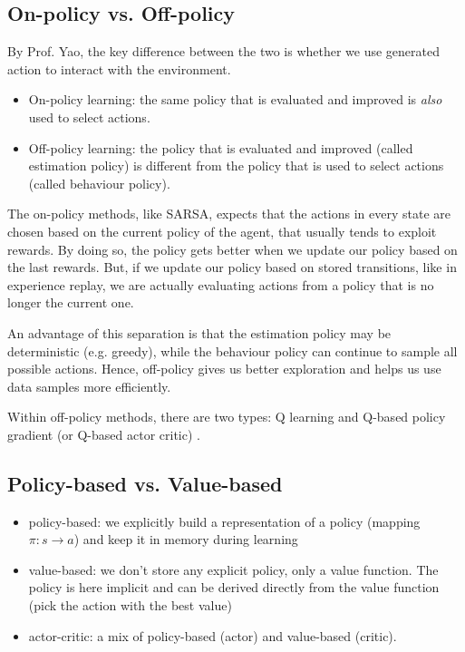 \documentclass[lang=en,mode=normal,device=normal,color=blue,12pt]{elegantnote}
\DeclareMathOperator*{\1}{\mathbbm{1}}
\begin{document}
\subsection{On-policy vs. Off-policy}
\label{appendix:on-off-policy}

By Prof. Yao, the key difference between the two is whether we use generated action to interact with the environment.

\begin{itemize}
\item On-policy learning: the same policy that is evaluated and improved is \textit{also} used to select actions.
\item Off-policy learning: the policy that is evaluated and improved (called estimation policy) is different from the policy that is used to select actions (called behaviour policy).
\end{itemize}

The on-policy methods, like SARSA, expects that the actions in every state are chosen based on the current policy of the agent, that usually tends to exploit rewards. By doing so, the policy gets better when we update our policy based on the last rewards. But, if we update our policy based on stored transitions, like in experience replay, we are actually evaluating actions from a policy that is no longer the current one.

An advantage of this separation is that the estimation policy may be deterministic (e.g. greedy), while the behaviour policy can continue to sample all possible actions.
Hence, off-policy gives us better exploration and helps us use data samples more efficiently.

Within off-policy methods, there are two types: Q learning and Q-based policy gradient (or Q-based actor critic) \cite{ytbcs287}.

\subsection{Policy-based vs. Value-based}

\begin{itemize}
\item policy-based: we explicitly build a representation of a policy (mapping $\pi:s\rightarrow a$) and keep it in memory during learning
\item value-based: we don't store any explicit policy, only a value function. The policy is here implicit and can be derived directly from the value function (pick the action with the best value)
\item actor-critic: a mix of policy-based (actor) and value-based (critic).
\end{itemize}
\end{document}
